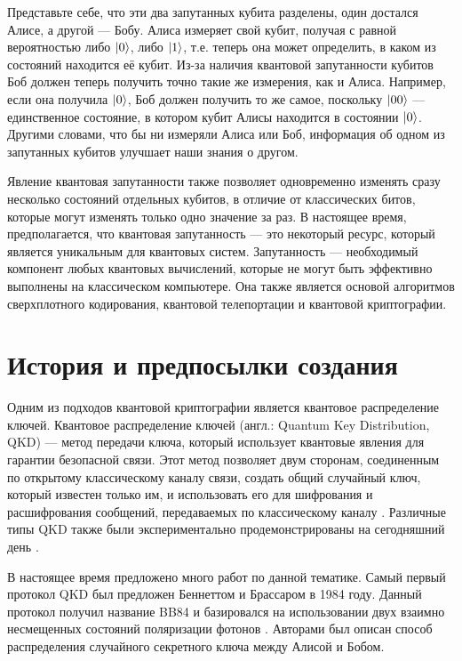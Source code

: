 \documentclass[a4paper,11pt]{article}
\begin{document}
Представьте себе, что эти два запутанных кубита разделены, один достался Алисе, а другой --- Бобу. Алиса измеряет свой кубит, получая с равной вероятностью либо $\ket{0}$, либо $\ket{1}$, т.е. теперь она может определить, в каком из состояний находится её кубит. Из-за наличия квантовой запутанности кубитов Боб должен теперь получить точно такие же измерения, как и Алиса. Например, если она получила $\ket{0}$, Боб должен получить то же самое, поскольку $\ket{00}$ --- единственное состояние, в котором кубит Алисы находится в состоянии $\ket{0}$. Другими словами, что бы ни измеряли Алиса или Боб, информация об одном из запутанных кубитов улучшает наши знания о другом.

Явление квантовая запутанности также позволяет одновременно изменять сразу несколько состояний отдельных кубитов, в отличие от классических битов, которые могут изменять только одно значение за раз. В настоящее время, предполагается, что квантовая запутанность --- это некоторый ресурс, который является уникальным для квантовых систем. Запутанность --- необходимый компонент любых квантовых вычислений, которые не могут быть эффективно выполнены на классическом компьютере. Она также является основой алгоритмов сверхплотного кодирования, квантовой телепортации и квантовой криптографии.

\section{История и предпосылки создания}\label{history}
Одним из подходов квантовой криптографии является квантовое распределение ключей.
Квантовое распределение ключей (англ.: Quantum Key Distribution, QKD) — метод передачи ключа, который использует квантовые явления для гарантии безопасной связи. Этот метод позволяет двум сторонам, соединенным по открытому классическому каналу связи, создать общий случайный ключ, который известен только им, и использовать его для шифрования и расшифрования сообщений, передаваемых по классическому каналу \cite{QKD,debate}. Различные типы QKD также были экспериментально продемонстрированы на сегодняшний день \cite{exp1,exp2}. 


В настоящее время предложено много работ по данной тематике. Самый первый протокол QKD был предложен Беннеттом и Брассаром в 1984 году. Данный протокол получил название BB84 и базировался на использовании двух взаимно несмещенных состояний поляризации фотонов \cite{BB84}. Авторами был описан способ распределения случайного секретного ключа между Алисой и Бобом. 
 
\end{document}
